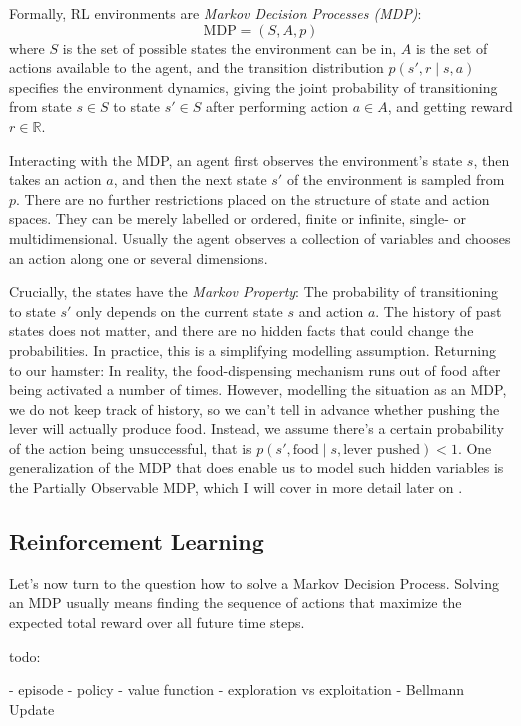 Formally, RL environments are \textit{Markov Decision Processes (MDP)}:
$$ \text{MDP} = (S, A, p)$$
where $S$ is the set of possible states the environment can be in, $A$ is the set of actions available to the agent,
and the transition distribution $p(s', r \mid s, a)$ specifies the environment dynamics, giving the joint probability of transitioning from state $s \in S$ to state $s'\in S$ after performing action $a \in A$, and getting reward $r \in \mathbb{R}$.

Interacting with the MDP, an agent first observes the environment's state $s$, then takes an action $a$, and then the next state $s'$ of the environment is sampled from $p$.
There are no further restrictions placed on the structure of state and action spaces. They can be merely labelled or ordered, finite or infinite, single- or multidimensional.
Usually the agent observes a collection of variables and chooses an action along one or several dimensions.

Crucially, the states have the \textit{Markov Property}: The probability of transitioning to state $s'$ only depends on the current state $s$ and action $a$.
The history of past states does not matter, and there are no hidden facts that could change the probabilities.
In practice, this is a simplifying modelling assumption.
Returning to our hamster: In reality, the food-dispensing mechanism runs out of food after being activated a number of times. However, modelling the situation as an MDP, we do not keep track of history, so we can't tell in advance whether pushing the lever will actually produce food. Instead, we assume there's a certain probability of the action being unsuccessful, that is $p(s', \text{food} \mid s, \text{lever pushed}) < 1$.
One generalization of the MDP that does enable us to model such hidden variables is the Partially Observable MDP, which I will cover in more detail later on .

\subsection{Reinforcement Learning}

Let's now turn to the question how to solve a Markov Decision Process. Solving an MDP usually means finding the sequence of actions that maximize the expected total reward over all future time steps.

todo:

- episode
- policy
- value function
- exploration vs exploitation
- Bellmann Update


